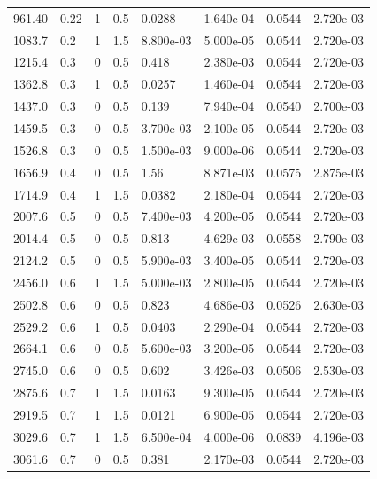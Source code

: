 \documentclass[preview]{standalone}
\begin{document}
{{\begin{tabular}{L{1.2cm}C{1.2cm} C{0.3cm}C{0.5cm} C{1.4cm}C{1.4cm} C{1.4cm}C{1.4cm}}
  961.40  &  0.22  & 1     & 0.5 &  0.0288  & 1.640e-04  & 0.0544 &  2.720e-03   \\ 
  1083.7  &   0.2  & 1     & 1.5 &  8.800e-03  & 5.000e-05  & 0.0544 &  2.720e-03   \\ 
  1215.4  &   0.3  & 0     & 0.5 &  0.418  & 2.380e-03  & 0.0544 &  2.720e-03   \\ 
  1362.8  &   0.3  & 1     & 0.5 &  0.0257  & 1.460e-04  & 0.0544 &  2.720e-03   \\ 
  1437.0  &   0.3  & 0     & 0.5 &  0.139  & 7.940e-04  & 0.0540 &  2.700e-03   \\ 
  1459.5  &   0.3  & 0     & 0.5 &  3.700e-03  & 2.100e-05  & 0.0544 &  2.720e-03   \\ 
  1526.8  &   0.3  & 0     & 0.5 &  1.500e-03  & 9.000e-06  & 0.0544 &  2.720e-03   \\ 
  1656.9  &   0.4  & 0     & 0.5 &  1.56  & 8.871e-03  & 0.0575 &  2.875e-03   \\ 
  1714.9  &   0.4  & 1     & 1.5 &  0.0382  & 2.180e-04  & 0.0544 &  2.720e-03   \\ 
  2007.6  &   0.5  & 0     & 0.5 &  7.400e-03  & 4.200e-05  & 0.0544 &  2.720e-03   \\ 
  2014.4  &   0.5  & 0     & 0.5 &  0.813  & 4.629e-03  & 0.0558 &  2.790e-03   \\ 
  2124.2  &   0.5  & 0     & 0.5 &  5.900e-03  & 3.400e-05  & 0.0544 &  2.720e-03   \\ 
  2456.0  &   0.6  & 1     & 1.5 &  5.000e-03  & 2.800e-05  & 0.0544 &  2.720e-03   \\ 
  2502.8  &   0.6  & 0     & 0.5 &  0.823  & 4.686e-03  & 0.0526 &  2.630e-03   \\ 
  2529.2  &   0.6  & 1     & 0.5 &  0.0403  & 2.290e-04  & 0.0544 &  2.720e-03   \\ 
  2664.1  &   0.6  & 0     & 0.5 &  5.600e-03  & 3.200e-05  & 0.0544 &  2.720e-03   \\ 
  2745.0  &   0.6  & 0     & 0.5 &  0.602  & 3.426e-03  & 0.0506 &  2.530e-03   \\ 
  2875.6  &   0.7  & 1     & 1.5 &  0.0163  & 9.300e-05  & 0.0544 &  2.720e-03   \\ 
  2919.5  &   0.7  & 1     & 1.5 &  0.0121  & 6.900e-05  & 0.0544 &  2.720e-03   \\ 
  3029.6  &   0.7  & 1     & 1.5 &  6.500e-04  & 4.000e-06  & 0.0839 &  4.196e-03   \\ 
  3061.6  &   0.7  & 0     & 0.5 &  0.381  & 2.170e-03  & 0.0544 &  2.720e-03   \\ 

\end{tabular}}}
\end{document}
